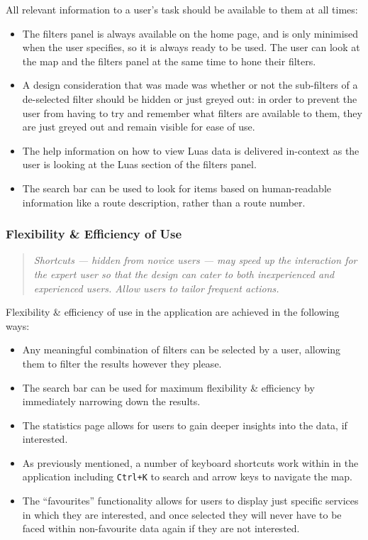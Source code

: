 \documentclass[a4paper,11pt]{report}
\begin{document}
All relevant information to a user's task should be available to them at all times:
\begin{itemize}
    \item   The filters panel is always available on the home page, and is only minimised when the user specifies, so it is always ready to be used. 
            The user can look at the map and the filters panel at the same time to hone their filters.

    \item   A design consideration that was made was whether or not the sub-filters of a de-selected filter should be hidden or just greyed out:
            in order to prevent the user from having to try and remember what filters are available to them, they are just greyed out and remain visible for ease of use.

    \item   The help information on how to view Luas data is delivered in-context as the user is looking at the Luas section of the filters panel.

    \item   The search bar can be used to look for items based on human-readable information like a route description, rather than a route number. 
\end{itemize}

\subsubsection{Flexibility \& Efficiency of Use}
\begin{quote}
    \textit{ Shortcuts — hidden from novice users — may speed up the interaction for the expert user so that the design can cater to both inexperienced and experienced users. Allow users to tailor frequent actions. }
\end{quote}
Flexibility \& efficiency of use in the application are achieved in the following ways: 
\begin{itemize}
    \item   Any meaningful combination of filters can be selected by a user, allowing them to filter the results however they please.
    \item   The search bar can be used for maximum flexibility \& efficiency by immediately narrowing down the results.
    \item   The statistics page allows for users to gain deeper insights into the data, if interested.
    \item   As previously mentioned, a number of keyboard shortcuts work within in the application including \verb|Ctrl+K| to search and arrow keys to navigate the map.
    \item   The ``favourites'' functionality allows for users to display just specific services in which they are interested, and once selected they will never have to be faced within non-favourite data again if they are not interested.
\end{itemize}
\end{document}
